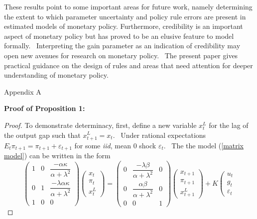 \documentclass{article}
\begin{document}
\begin{doublespace}
These results point to some important areas for future work, namely
determining the extent to which parameter uncertainty and policy rule errors
are present in estimated models of monetary policy. Furthermore, credibility
is an important aspect of monetary policy but has proved to be an elusive
feature to model formally. \ Interpreting the gain parameter as an
indication of credibility may open new avenues for research on monetary
policy. \ The present paper gives practical guidance on the design of rules
and areas that need attention for deeper understanding of monetary policy.

\bigskip

{\LARGE Appendix A}

\textbf{Proof of Proposition 1:}

\begin{proof}
To demonstrate determinacy, first, define a new variable $x_{t}^{L}$ for the
lag of the output gap such that $x_{t+1}^{L}=x_{t}$. \ Under rational
expectations $E_{t}\pi _{t+1}=\pi _{t+1}+\varepsilon _{t+1}$ for some 
\textit{iid}, mean 0 shock $\varepsilon _{t}$. \ The the model (\ref{matrix
model}) can be written in the form 
\begin{equation*}
\left( 
\begin{array}{ccc}
1 & 0 & \dfrac{-\alpha \kappa }{\alpha +\lambda ^{2}} \\ 
0 & 1 & \dfrac{-\lambda \alpha \kappa }{\alpha +\lambda ^{2}} \\ 
1 & 0 & 0%
\end{array}%
\right) \left( 
\begin{array}{c}
x_{t} \\ 
\pi _{t} \\ 
x_{t}^{L}%
\end{array}%
\right) =\left( 
\begin{array}{ccc}
0 & \dfrac{-\lambda \beta }{\alpha +\lambda ^{2}} & 0 \\ 
0 & \dfrac{\alpha \beta }{\alpha +\lambda ^{2}} & 0 \\ 
0 & 0 & 1%
\end{array}%
\right) \left( 
\begin{array}{c}
x_{t+1} \\ 
\pi _{t+1} \\ 
x_{t+1}^{L}%
\end{array}%
\right) +K\left( 
\begin{array}{c}
u_{t} \\ 
g_{t} \\ 
\varepsilon _{t}%

\end{array}
\end{equation*}
\end{proof}
\end{doublespace}
\end{document}
